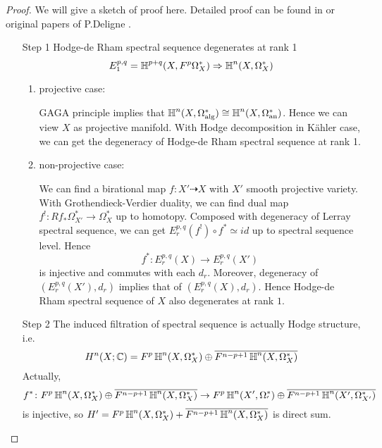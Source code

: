 \documentclass{amsart}
\begin{document}
\begin{proof}
	We will give a sketch of proof here. Detailed proof can be found in \cite{Cattani2014} or original papers of P.Deligne \cite{Deligne1971,Deligne1974}.
	\begin{itemize}
		\item[Step 1] Hodge-de Rham spectral sequence degenerates at rank 1
		\[
		E_1^{p,q}= \operatorname{\mathbb{H}}^{p+q}(X, F^p \Omega^*_X) \Rightarrow \operatorname{\mathbb{H}}^{n}(X, \Omega^*_X)
		\]
		\begin{enumerate}
			\item{projective case:}
			
			GAGA principle implies that $\operatorname{\mathbb{H}}^{n}(X, \Omega^*_{\text{alg}}) \cong \operatorname{\mathbb{H}}^{n}(X, \Omega^*_{\text{an}})$. Hence we can view $X$ as projective manifold. With Hodge decomposition in K\"ahler case, we can get the degeneracy of Hodge-de Rham spectral sequence at rank 1.
			\item{non-projective case:} 
			
			We can find a birational map $f: X' \dashrightarrow X$ with $X'$ smooth projective variety. With Grothendieck-Verdier duality, we can find dual map $f^!\colon Rf_*\Omega_{X'}^* \to \Omega_X^*$ up to homotopy. Composed with degeneracy of Lerray spectral sequence, we can get $E_r^{p,q}(f^!) \circ f^* \simeq id$ up to spectral sequence level. Hence
			\begin{equation}
				f^* \colon E_r^{p,q}(X) \to E_r^{p,q}(X')
			\end{equation}
			is injective and commutes with each $d_r$. Moreover, degeneracy of $(E_r^{p,q}(X'),d_r)$ implies that of $(E_r^{p,q}(X),d_r)$. Hence Hodge-de Rham spectral sequence of $X$ also degenerates at rank $1$.
		\end{enumerate}
		\item[Step 2] The induced filtration of spectral sequence is actually Hodge structure, i.e.\ 
		\[
		H^{n}(X;\mathbb{C}) = F^{p}\operatorname{\mathbb{H}}^n(X, \Omega_X^*) \oplus \overline{F^{n-p+1}\operatorname{\mathbb{H}}^{n}(X,\Omega_X^*)}
		\]
		Actually, 
		\[
		f^* \colon F^{p}\operatorname{\mathbb{H}}^n(X, \Omega_X^*) \oplus \overline{F^{n-p+1}\operatorname{\mathbb{H}}^{n}(X,\Omega_X^*)} \to F^{p}\operatorname{\mathbb{H}}^n(X', \Omega_{'}^*) \oplus \overline{F^{n-p+1}\operatorname{\mathbb{H}}^{n}(X',\Omega_{X'}^*)}
		\]
		is injective, so $H'=F^{p}\operatorname{\mathbb{H}}^n(X, \Omega_X^*) + \overline{F^{n-p+1}\operatorname{\mathbb{H}}^{n}(X,\Omega_X^*)}$ is direct sum.
		

\end{itemize}
\end{proof}
\end{document}
